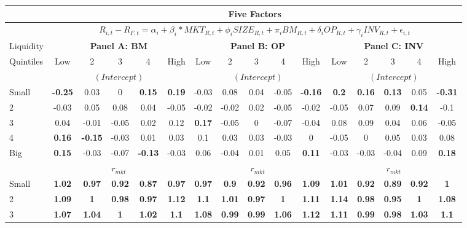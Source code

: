 \begin{table}[H]
\tiny
\centering
\begin{tabular}{lccccc|ccccc|ccccc}
\hline
& \multicolumn{15}{c}{Five Factors} \\ \hline
& \multicolumn{15}{c}{\tiny $R_{i,t} - R_{F,t} = \alpha_i+\beta_i*MKT_{R,t} + \phi_iSIZE_{R,t}+\pi_iBM_{R,t} + \delta_iOP_{R,t}+\gamma_iINV_{R,t} + \epsilon_{i,t}$} \\ \hline
Liquidity & \multicolumn{5}{c|}{\textbf{Panel A: BM}} & \multicolumn{5}{c|}{\textbf{Panel B: OP}} & \multicolumn{5}{c}{\textbf{Panel C: INV}} \\
Quintiles & Low & 2 & 3 & 4 & High & Low & 2 & 3 & 4 & High & Low & 2 & 3 & 4 & High \\  \hline
 & \multicolumn{5}{c|}{$(Intercept)$} & \multicolumn{5}{c|}{$(Intercept)$} & \multicolumn{5}{c}{$(Intercept)$} \\
Small & \textbf{-0.25} & 0.03 & 0 & \textbf{0.15} & \textbf{0.19} & -0.03 & 0.08 & 0.04 & -0.05 & \textbf{-0.16} & \textbf{0.2} & \textbf{0.16} & \textbf{0.13} & 0.05 & \textbf{-0.31} \\
2 & -0.03 & 0.05 & 0.08 & 0.04 & -0.05 & -0.02 & -0.02 & 0.02 & -0.05 & -0.02 & -0.05 & 0.07 & 0.09 & \textbf{0.14} & -0.1 \\
3 & 0.04 & -0.01 & -0.05 & 0.02 & 0.12 & \textbf{0.17} & -0.05 & 0 & -0.07 & -0.04 & 0.08 & 0.09 & 0.04 & 0.06 & -0.05 \\
4 & \textbf{0.16} & \textbf{-0.15} & -0.03 & 0.01 & 0.03 & 0.1 & 0.03 & 0.03 & -0.03 & 0 & -0.05 & 0 & 0.05 & 0.03 & 0.08 \\
Big & \textbf{0.15} & -0.03 & -0.07 & \textbf{-0.13} & -0.03 & 0.06 & -0.04 & 0.01 & 0.05 & \textbf{0.11} & -0.03 & -0.03 & -0.04 & 0.09 & \textbf{0.18} \\
 & \multicolumn{5}{c|}{$r_{mkt}$} & \multicolumn{5}{c|}{$r_{mkt}$} & \multicolumn{5}{c}{$r_{mkt}$} \\
Small & \textbf{1.02} & \textbf{0.97} & \textbf{0.92} & \textbf{0.87} & \textbf{0.97} & \textbf{0.97} & \textbf{0.9} & \textbf{0.92} & \textbf{0.96} & \textbf{1.09} & \textbf{1.01} & \textbf{0.92} & \textbf{0.89} & \textbf{0.92} & \textbf{1} \\
2 & \textbf{1.09} & \textbf{1} & \textbf{0.98} & \textbf{0.97} & \textbf{1.12} & \textbf{1.1} & \textbf{1.01} & \textbf{0.97} & \textbf{1} & \textbf{1.11} & \textbf{1.14} & \textbf{0.98} & \textbf{0.95} & \textbf{1} & \textbf{1.08} \\
3 & \textbf{1.07} & \textbf{1.04} & \textbf{1} & \textbf{1.02} & \textbf{1.1} & \textbf{1.08} & \textbf{0.99} & \textbf{0.99} & \textbf{1.06} & \textbf{1.12} & \textbf{1.11} & \textbf{0.99} & \textbf{0.98} & \textbf{1.03} & \textbf{1.1} \\

\end{tabular}
\end{table}
